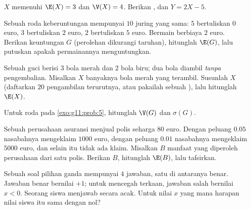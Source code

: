 \begin{exercise}[$\star$]\label{exo:g11:prob:4}
$X$ memenuhi $\E(X) = 3$ dan $\V(X) = 4$. Berikan , 
dan  $Y = 2X - 5$.
\end{exercise}

\begin{exercise}[$\star\star$]\label{exo:g11:prob:5}
Sebuah roda keberuntungan mempunyai $10$ juring yang sama: $5$ bertuliskan $0$
euro, $3$ bertuliskan $2$ euro, $2$ bertuliskan $5$ euro. Bermain berbiaya $2$
euro. Berikan  keuntungan $G$ (perolehan dikurangi taruhan),
hitunglah $\E(G)$, lalu putuskan apakah permainannya menguntungkan.
\end{exercise}

\begin{exercise}[$\star\star$]\label{exo:g11:prob:6}
Sebuah guci berisi $3$ bola merah dan $2$ bola biru; dua bola diambil
\emph{tanpa} pengembalian. Misalkan $X$ banyaknya bola merah yang terambil.
Susunlah  $X$ (daftarkan $20$ pengambilan terurutnya, atau pakailah
sebuah ), lalu hitunglah $\E(X)$.
\end{exercise}

\begin{exercise}[$\star\star$]\label{exo:g11:prob:7}
Untuk roda pada \cref{exo:g11:prob:5}, hitunglah $\V(G)$ dan $\sigma(G)$.
\end{exercise}

\begin{exercise}[$\star\star$]\label{exo:g11:prob:8}
Sebuah perusahaan asuransi menjual polis seharga $80$ euro. Dengan peluang
$0.05$ nasabahnya mengeklaim $1000$ euro, dengan peluang $0.01$ nasabahnya
mengeklaim $5000$ euro, dan selain itu tidak ada klaim. Misalkan $B$ manfaat
yang diperoleh perusahaan dari satu polis. Berikan  $B$, hitunglah
$\E(B)$, lalu tafsirkan.
\end{exercise}

\begin{exercise}[$\star\star$]\label{exo:g11:prob:9}
Sebuah soal pilihan ganda mempunyai $4$ jawaban, satu di antaranya benar.
Jawaban benar bernilai $+1$; untuk mencegah terkaan, jawaban salah bernilai
$x < 0$. Seorang siswa menjawab secara acak. Untuk nilai $x$ yang mana harapan
nilai siswa itu sama dengan nol?
\end{exercise}

